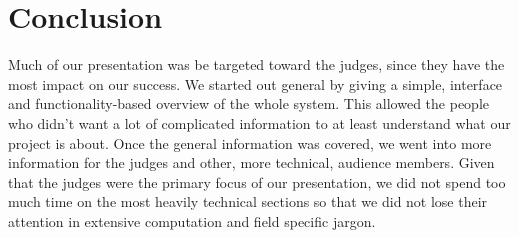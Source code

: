 \section{Conclusion}
Much of our presentation was be targeted toward the judges, since they have the most impact on our success. We started out general by giving a simple, interface and functionality-based overview of the whole system. This allowed the people who didn't want a lot of complicated information to at least understand what our project is about. Once the general information was covered, we went into more information for the judges and other, more technical, audience members. Given that the judges were the primary focus of our presentation, we did not spend too much time on the most heavily technical sections so that we did not lose their attention in extensive computation and field specific jargon.